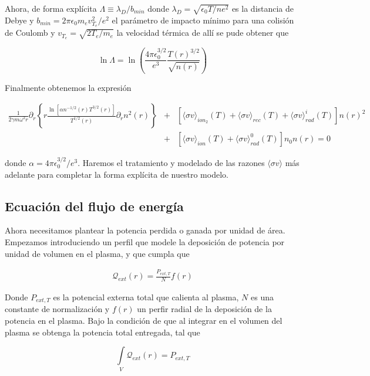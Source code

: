 Ahora, de forma expl\'icita $\Lambda \equiv \lambda_D/b_{min}$ donde $\lambda_D = \sqrt{\epsilon_0 T / n e^2 }$ es la distancia de Debye y $b_{min} = 2\pi \epsilon_0 m_e v_{T_e}^2/e^2$ el par\'ametro de impacto m\'inimo para una colisi\'on de Coulomb y $v_{T_e} = \sqrt{2 T_e / m_e}$ la velocidad t\'ermica \cite{helander2005} de all\'i se pude obtener que 

\begin{equation*}
  \ln{\Lambda} = \ln\left(\frac{4\pi\epsilon_0^{3/2}}{e^3}\frac{T(r)^{3/2}}{\sqrt{n(r)}}\right)
\end{equation*}

Finalmente obtenemos la expresi\'on

\begin{eqnarray}\label{eq:ODE1}
  \frac{1}{2\gamma m\omega^2 r}\partial_r\left\{r\frac{\ln\left[\alpha n^{-1/2}(r)T^{3/2}(r)\right]}{T^{1/2}(r)}\partial_r n^2(r)\right\} &+& [\langle\sigma v\rangle_{ion_2}(T) + \langle\sigma v\rangle_{rec}(T) + \langle\sigma v\rangle_{rad}^i(T)]n(r)^2 \nonumber\\&+& [\langle\sigma v\rangle_{ion}(T)+ \langle\sigma v\rangle_{rad}^0(T)]n_0n(r) = 0 \label{eq:particleEq}
\end{eqnarray}

donde $\alpha = 4\pi\epsilon_0^{3/2}/e^3$. Haremos el tratamiento y modelado de las razones $\langle \sigma v\rangle$ m\'as adelante para completar la forma expl\'icita de nuestro modelo.

\subsection{Ecuaci\'on del flujo de energ\'ia}

Ahora necesitamos plantear la potencia perdida o ganada por unidad de \'area. Empezamos introduciendo un perfil que modele la deposici\'on de potencia por unidad de volumen en el plasma, y que cumpla que 

\begin{eqnarray*}
  \mathcal{Q}_{ext}(r) = \frac{P_{ext,T}}{N}f(r)
\end{eqnarray*}

Donde $P_{ext,T}$ es la potencial externa total que calienta al plasma, $N$ es una constante de normalizaci\'on y $f(r)$ un perfir radial de la deposici\'on de la potencia en el plasma. Bajo la condici\'on de que al integrar en el volumen del plasma se obtenga la potencia total entregada, tal que 
 
\begin{equation*}
  \int\limits_V \mathcal{Q}_{ext}(r) = P_{ext,T}
\end{equation*}

